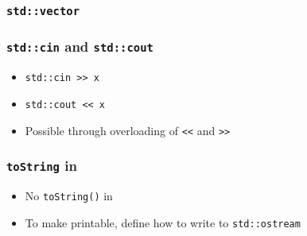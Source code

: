 \documentclass{../ucll-slides}
\begin{document}
\begin{frame}
  \frametitle{\tt std::vector}
\end{frame}

\begin{frame}
  \frametitle{{\tt std::cin} and {\tt std::cout}}
  \begin{itemize}
    \item {\tt std::cin >> x}
    \item {\tt std::cout << x}
    \item Possible through overloading of {\tt <<} and {\tt >>}
  \end{itemize}
\end{frame}

\begin{frame}
  \frametitle{{\tt toString} in \cpp}
  \begin{itemize}
    \item No {\tt toString()} in \cpp
    \item To make printable, define how to write to {\tt std::ostream}
  \end{itemize}
\end{frame}
\end{document}
